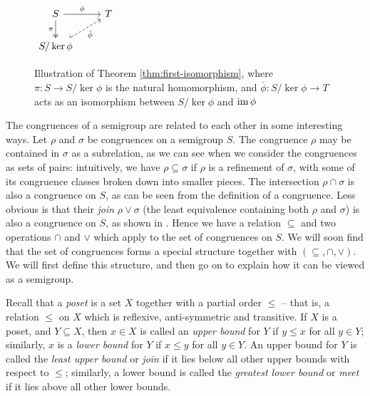 \begin{figure}[ht]
  \centering
  $
  \begin{tikzcd}
    S \ar[d, two heads, "\pi"'] \ar[r, "\phi"] & T \\
    S / \ker{\phi} \ar[ur, dashed, hook, "\bar\phi"']
  \end{tikzcd}
  $
  \caption[Illustration of Theorem \ref{thm:first-isomorphism}]
  {Illustration of Theorem \ref{thm:first-isomorphism}, where
    $\pi : S \to S/\ker\phi$ is the natural homomorphism, and
    $\bar\phi: S/\ker\phi \to T$ acts as an isomorphism between $S/\ker\phi$ and
    $\operatorname{im}\phi$}
  \label{fig:first-isomorphism-theorem}
\end{figure}

The congruences of a semigroup are related to each other in some interesting
ways.  Let $\rho$ and $\sigma$ be congruences on a semigroup $S$.  The
congruence $\rho$ may be contained in $\sigma$ as a subrelation, as we can see
when we consider the congruences as sets of pairs: intuitively, we have
$\rho \subseteq \sigma$ if $\rho$ is a refinement of $\sigma$, with some of its
congruence classes broken down into smaller pieces.  The intersection
$\rho \cap \sigma$ is also a congruence on $S$, as can be seen from the
definition of a congruence.  Less obvious is that their \textit{join}
$\rho \vee \sigma$ (the least equivalence containing both $\rho$ and $\sigma$)
is also a congruence on $S$, as shown in \cite[\S1.5]{howie}.  Hence we have
a relation $\subseteq$ and two operations $\cap$ and $\vee$ which apply to the set of
congruences on $S$.  We will soon find that the set of congruences forms a
special structure together with $(\subseteq, \cap, \vee)$.  We will first define this
structure, and then go on to explain how it can be viewed as a semigroup.

Recall that a \textit{poset} is a set $X$ together with a partial order $\leq$
-- that is, a relation $\leq$ on $X$ which is reflexive, anti-symmetric and
transitive.  If $X$ is a poset, and $Y \subseteq X$, then $x \in X$ is called an
\textit{upper bound} for $Y$ if $y \leq x$ for all $y \in Y$; similarly, $x$ is
a \textit{lower bound} for $Y$ if $x \leq y$ for all $y \in Y$.  An upper bound
for $Y$ is called the \textit{least upper bound} or \textit{join} if it lies
below all other upper bounds with respect to $\leq$; similarly, a lower bound is
called the \textit{greatest lower bound} or \textit{meet} if it lies above all
other lower bounds.    
   

